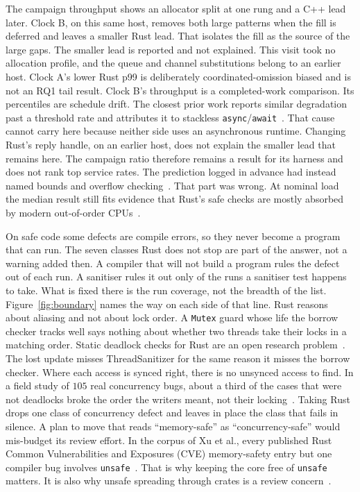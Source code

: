 \documentclass[english,oneside,a4paper,censored,csm,software-track-2020]{HYthesisML}
\begin{document}
The campaign throughput shows an allocator split at one rung and a C++ lead
later. Clock B, on this same host, removes both large patterns when the fill
is deferred and leaves a smaller Rust lead. That isolates the fill as the
source of the large gaps. The smaller lead is reported and not explained.
This visit took no allocation profile, and the queue and channel
substitutions belong to an earlier host. Clock A's
lower Rust p99 is deliberately coordinated-omission biased and is not an RQ1
tail result. Clock B's throughput is a completed-work comparison. Its
percentiles are schedule drift. The closest prior work reports
similar degradation past a threshold rate and attributes it to stackless
\texttt{async}/\texttt{await}~\cite{arvidsson2025async}. That cause cannot
carry here because neither side uses an asynchronous runtime. Changing Rust's
reply handle, on an earlier host, does not explain the smaller lead that
remains here. The campaign ratio therefore
remains a result for its harness and does not rank top service rates. The
prediction logged in advance had instead named bounds and overflow
checking~\cite{zhang2022runtime,harris2023morello}. That part was wrong. At
nominal load the median result still fits evidence that Rust's safe checks are
mostly absorbed by modern out-of-order
CPUs~\cite{balasubramanian2017rust,emmerich2019drivers}.

On safe code some defects are compile errors, so they never become a program that can run. The seven classes Rust
does not stop are part of the answer, not a warning added then. A
compiler that will not build a program rules the defect out of each
run. A sanitiser rules it out only of the
runs a sanitiser test happens to take. What is fixed there is the
run coverage, not the breadth of the list.
Figure~\ref{fig:boundary} names the way on each side of that line. Rust
reasons about aliasing and not about lock order. A \texttt{Mutex} guard
whose life the borrow checker tracks well says nothing about whether
two threads take their locks in a matching
order. Static deadlock checks for Rust are an open research
problem~\cite{zhang2026deadlock}. The lost update misses ThreadSanitizer for the
same reason it misses the borrow checker. Where each access is synced
right, there is no unsynced access to find. In a field study of
$105$ real concurrency bugs, about a third of the cases that were not deadlocks broke
the order the writers meant, not their
locking~\cite{lu2008mistakes}. Taking Rust drops one class of concurrency
defect and leaves in place the class that fails in silence. A plan to move that
reads ``memory-safe'' as ``concurrency-safe'' would mis-budget its review
effort. In the corpus of Xu et al., every published Rust Common
Vulnerabilities and Exposures (CVE) memory-safety entry but one compiler bug
involves \texttt{unsafe}~\cite{xu2021rustcve}.
That is why keeping the core free of \texttt{unsafe} matters. It is also why unsafe
spreading through crates is a review concern~\cite{evans2020rust}.
\end{document}
